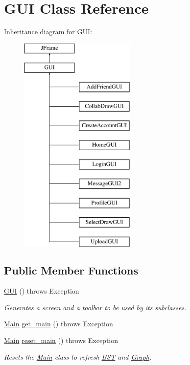 \hypertarget{class_g_u_i}{}\section{G\+UI Class Reference}
\label{class_g_u_i}
Inheritance diagram for G\+UI\+:\begin{figure}[H]
\begin{center}
\leavevmode
\includegraphics[height=11.000000cm]{class_g_u_i}
\end{center}
\end{figure}
\subsection*{Public Member Functions}
\begin{DoxyCompactItemize}
\item 
\mbox{\label{class_g_u_i_a35a15f9dcfca9111335e4401a46567ed}} 
\hyperlink{class_g_u_i_a35a15f9dcfca9111335e4401a46567ed}{G\+UI} ()  throws Exception
\begin{DoxyCompactList}\small\item\em Generates a screen and a toolbar to be used by its subclasses. \end{DoxyCompactList}\item 
\hyperlink{class_main}{Main} \hyperlink{class_g_u_i_abd66813fa465e8cc1f992b250fe1df5b}{get\+\_\+main} ()  throws Exception     
\item 
\mbox{\label{class_g_u_i_ab5f498113cffdcfd9f41c026b697acfc}} 
\hyperlink{class_main}{Main} \hyperlink{class_g_u_i_ab5f498113cffdcfd9f41c026b697acfc}{reset\+\_\+main} ()  throws Exception     
\begin{DoxyCompactList}\small\item\em Resets the \hyperlink{class_main}{Main} class to refresh \hyperlink{class_b_s_t}{B\+ST} and \hyperlink{class_graph}{Graph}. \end{DoxyCompactList}\end{DoxyCompactItemize}
